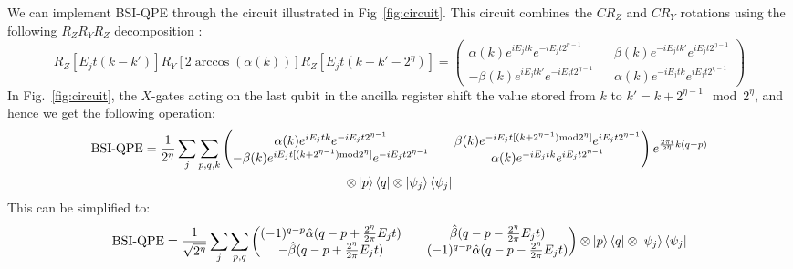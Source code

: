 \documentclass[aps,floatfix,10pt,amssymb,amsfont,amsmath,superscriptaddress,float,nofootinbib,longbibliography,nobalancelastpage,twocolumn]{revtex4-2}
\begin{document}
\begin{widetext}
We can implement BSI-QPE through the circuit illustrated in Fig~\ref{fig:circuit}. This circuit combines the  $CR_Z$ and $CR_Y$ rotations using the following $R_ZR_YR_Z$ decomposition \cite{Nielsen_Chuang_2010}: 
\begin{equation}
\label{eq:euler}
    R_Z[E_jt(k-k')]R_Y[2\arccos(\alpha(k))]R_Z[E_jt(k+k'-2^{\eta})] = \begin{pmatrix}
        \alpha(k)e^{iE_jtk}e^{-iE_jt2^{\eta-1}} && \beta(k)e^{-iE_jt k'}e^{iE_jt2^{\eta-1}}\\
        -\beta (k)e^{iE_jt k'}e^{-iE_jt2^{\eta-1}} && \alpha(k)e^{-iE_jtk}e^{iE_jt2^{\eta-1}}
    \end{pmatrix}
\end{equation}
In Fig.~\ref{fig:circuit}, the $X$-gates acting on the last qubit in the ancilla register shift the value stored from $k$ to $k'= k+2^{\eta-1} \mod 2^{\eta}$, and hence we get the following operation:
\begin{multline}
        \text{BSI-QPE} = \frac{1}{2^{\eta}}\sum_j\sum_{p,q,k} \begin{pmatrix}
        \alpha(k)e^{iE_jtk}e^{-iE_jt2^{\eta-1}} && \beta(k)e^{-iE_jt[(k+2^{\eta-1})\text{mod} 2^{\eta}]}e^{iE_jt2^{\eta-1}}\\
        -\beta (k)e^{iE_jt[(k+2^{\eta-1})\text{mod} 2^{\eta}]}e^{-iE_jt2^{\eta-1}} && \alpha(k)e^{-iE_jtk}e^{iE_jt2^{\eta-1}}
    \end{pmatrix}e^{\frac{2\pi i}{2^{\eta}}k(q-p)} \\\otimes\ket{p}\bra{q}\otimes\ket{\psi_j}\bra{\psi_j}
\end{multline}
This can be simplified to:
\begin{equation}
    \text{BSI-QPE} = \frac{1}{\sqrt{2^{\eta}}}\sum_j\sum_{p,q} \begin{pmatrix}
        (-1)^{q-p}\hat\alpha(q-p+\frac{2^{\eta}}{2\pi}E_jt) && \hat\beta(q-p-\frac{2^{\eta}}{2\pi}E_jt)\\
        -\hat\beta (q-p+\frac{2^{\eta}}{2\pi}E_jt) && (-1)^{q-p}\hat\alpha(q-p-\frac{2^{\eta}}{2\pi}E_jt)
    \end{pmatrix}\otimes\ket{p}\bra{q}\otimes\ket{\psi_j}\bra{\psi_j}
\end{equation}

\end{widetext}
\end{document}
